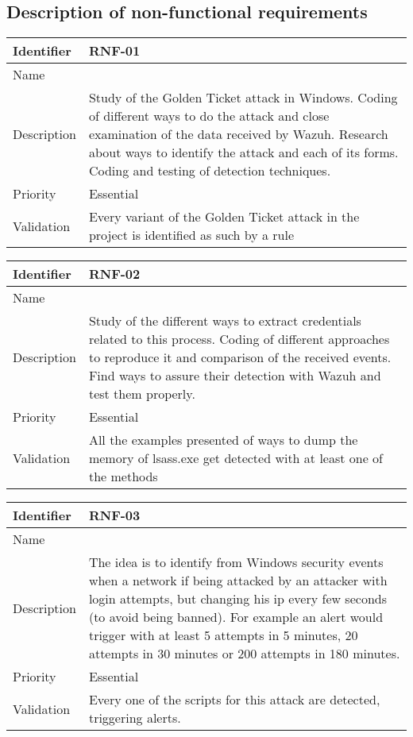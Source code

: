 \subsection{Description of non-functional requirements}
\begin{table}[H]
	\begin{tabularx}{\textwidth}{|l|X|}
		\hline
		\rowcolor{gray!30}
		Identifier & \textbf{RNF-01} \\ \hline
		Name & \RNFuno \\ \hline
		Description & Study of the Golden Ticket attack in Windows. Coding of different ways to do the attack and close examination of the data received by Wazuh. Research about ways to identify the attack and each of its forms. Coding and testing of detection techniques. \\ \hline
		Priority & Essential \\ \hline
		Validation & Every variant of the Golden Ticket attack in the project is identified as such by a rule \\ \hline
	\end{tabularx}
\end{table}
\begin{table}[H]
	\begin{tabularx}{\textwidth}{|l|X|}
		\hline
		\rowcolor{gray!30}
		Identifier & \textbf{RNF-02} \\ \hline
		Name & \RNFdos \\ \hline
		Description & Study of the different ways to extract credentials related to this process. Coding of different approaches to reproduce it and comparison of the received events. Find ways to assure their detection with Wazuh and test them properly. \\ \hline
		Priority & Essential \\ \hline
		Validation & All the examples presented of ways to dump the memory of lsass.exe get detected with at least one of the methods \\ \hline
	\end{tabularx}
\end{table}
\begin{table}[H]
	\begin{tabularx}{\textwidth}{|l|X|}
		\hline
		\rowcolor{gray!30}
		Identifier & \textbf{RNF-03} \\ \hline
		Name & \RNFtres \\ \hline
		Description & The idea is to identify from Windows security events when a network if being attacked by an attacker with login attempts, but changing his ip every few seconds (to avoid being banned). For example an alert would trigger with at least 5 attempts in 5 minutes, 20 attempts in 30 minutes or 200 attempts in 180 minutes. \\ \hline
		Priority & Essential \\ \hline
		Validation & Every one of the scripts for this attack are detected, triggering alerts. \\ \hline
	\end{tabularx}
\end{table}
